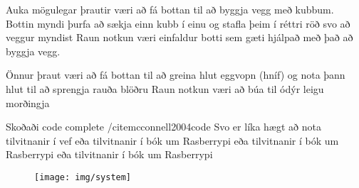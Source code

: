 Auka mögulegar þrautir væri að fá bottan til að byggja vegg með kubbum. Bottin myndi þurfa að sækja einn kubb í einu og stafla þeim í réttri röð svo að veggur myndist
Raun notkun væri einfaldur botti sem gæti hjálpað með það að byggja vegg.

Önnur þraut væri að fá bottan til að greina hlut eggvopn (hníf) og nota þann hlut til að sprengja rauða blöðru
Raun notkun væri að búa til ódýr leigu morðingja


Skoðaði code complete /cite{mcconnell2004code}
Svo er líka hægt að nota tilvitnanir í vef \cite{WinNT}
eða tilvitnanir í bók um Rasberrypi \cite{brock2013changing}
eða tilvitnanir í bók um Rasberrypi \cite{test}
eða tilvitnanir í bók um Rasberrypi \cite{test2}
\begin{figure}[h]
\texttt{[image: img/system]}
\end{figure}